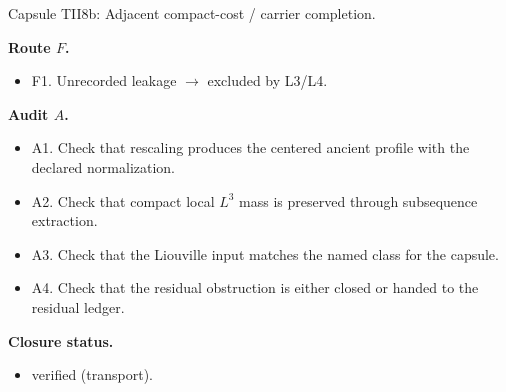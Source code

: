 \documentclass[11pt]{amsart}
\newcommand{\capsulefield}[1]{\par\smallskip\noindent\textbf{#1.}\ }
\begin{document}
\begin{proofcapsule}{Capsule TII8b: Adjacent compact-cost / carrier completion.}
  \capsulefield{Route \(F\)}
  \begin{itemize}[leftmargin=1.8em]
  \item F1. Unrecorded leakage $\to$ excluded by L3/L4.
  \end{itemize}

  \capsulefield{Audit \(A\)}
  \begin{itemize}[leftmargin=1.8em]
  \item A1. Check that rescaling produces the centered ancient profile with the declared normalization.
  \item A2. Check that compact local $L^3$ mass is preserved through subsequence extraction.
  \item A3. Check that the Liouville input matches the named class for the capsule.
  \item A4. Check that the residual obstruction is either closed or handed to the residual ledger.
  \end{itemize}
  \capsulefield{Closure status}
  \begin{itemize}[leftmargin=1.8em]
  \item verified (transport).
  \end{itemize}
\end{proofcapsule}
\end{document}
